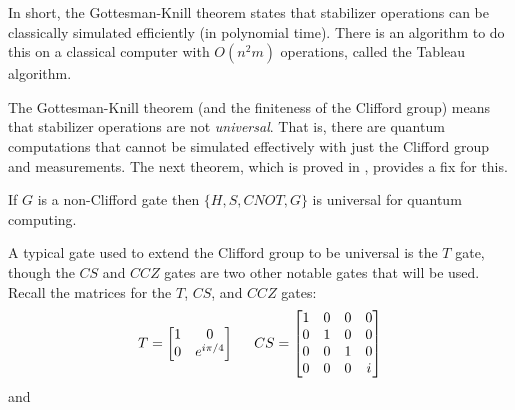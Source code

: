 \documentclass[12pt]{dalthesis}
\begin{document}
In short, the Gottesman-Knill theorem states that stabilizer operations can be classically simulated efficiently (in polynomial time). There is an algorithm to do this on a classical computer with $O(n^2m)$ operations, called the Tableau algorithm. 

The Gottesman-Knill theorem (and the finiteness of the Clifford group) means that stabilizer operations are not \emph{universal}. That is, there are quantum computations that cannot be simulated effectively with just the Clifford group and measurements. The next theorem, which is proved in \cite{Nebe}, provides a fix for this.

\begin{theorem}
If $G$ is a non-Clifford gate then $\{ H, S, CNOT, G \}$ is universal for quantum computing.
\end{theorem}

A typical gate used to extend the Clifford group to be universal is the $T$ gate, though the $CS$ and $CCZ$ gates are two other notable gates that will be used. Recall the matrices for the $T$, $CS$, and $CCZ$ gates:
\begin{equation*}
T = 
\begin{bmatrix}
1 & 0 \\
0 & e^{i\pi/4}
\end{bmatrix}
\hspace{5mm}
CS = 
\begin{bmatrix}
1 & 0 & 0 & 0 \\
0 & 1 & 0 & 0 \\
0 & 0 & 1 & 0 \\
0 & 0 & 0 & i \\
\end{bmatrix}
\end{equation*}
and
\end{document}
